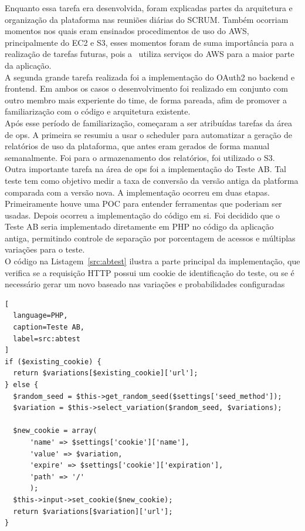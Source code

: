 Enquanto essa tarefa era desenvolvida, foram explicadas partes da arquitetura e organização da plataforma nas reuniões diárias do \gls{SCRUM}. Também ocorriam momentos nos quais eram ensinados procedimentos de uso do \gls{AWS}, principalmente do \gls{EC2} e \gls{S3}, esses momentos foram de suma importância para a realização de tarefas futuras, pois a \nomeEmpresa~utiliza serviços do \gls{AWS} para a maior parte da aplicação.\\

A segunda grande tarefa realizada foi a implementação do \gls{OAuth2} no \gls{backend} e \gls{frontend}. Em ambos os casos o desenvolvimento foi realizado em conjunto com outro membro mais experiente do time, de forma pareada, afim de promover a familiarização com o código e arquitetura existente.\\

Após esse período de familiarização, começaram a ser atribuídas tarefas da área de \gls{ops}. A primeira se resumiu a usar o \gls{scheduler} para automatizar a geração de relatórios de uso da plataforma, que antes eram gerados de forma manual semanalmente. Foi para o armazenamento dos relatórios, foi utilizado o \gls{S3}.\\

Outra importante tarefa na área de \gls{ops} foi a implementação do \gls{Teste AB}. Tal teste tem como objetivo medir a taxa de conversão da versão antiga da platforma comparada com a versão nova. A implementação ocorreu em duas etapas. Primeiramente houve uma \gls{POC} para entender ferramentas que poderiam ser usadas. Depois ocorreu a implementação do código em si. Foi decidido que o \gls{Teste AB} seria implementado diretamente em \gls{PHP} no código da aplicação antiga, permitindo controle de separação por porcentagem de acessos e múltiplas variações para o teste.\\

O código na Listagem~\ref{src:abtest} ilustra a parte principal da implementação, que verifica se a requisição \gls{HTTP} possui um \gls{cookie} de identificação do teste, ou se é necessário gerar um novo baseado nas variações e probabilidades configuradas\\

\begin{lstlisting}[
  language=PHP,
  caption=Teste AB,
  label=src:abtest
]
if ($existing_cookie) {
  return $variations[$existing_cookie]['url'];
} else {
  $random_seed = $this->get_random_seed($settings['seed_method']);
  $variation = $this->select_variation($random_seed, $variations);

  $new_cookie = array(
      'name' => $settings['cookie']['name'],
      'value' => $variation,
      'expire' => $settings['cookie']['expiration'],
      'path' => '/'
      );
  $this->input->set_cookie($new_cookie);
  return $variations[$variation]['url'];
}
\end{lstlisting}

